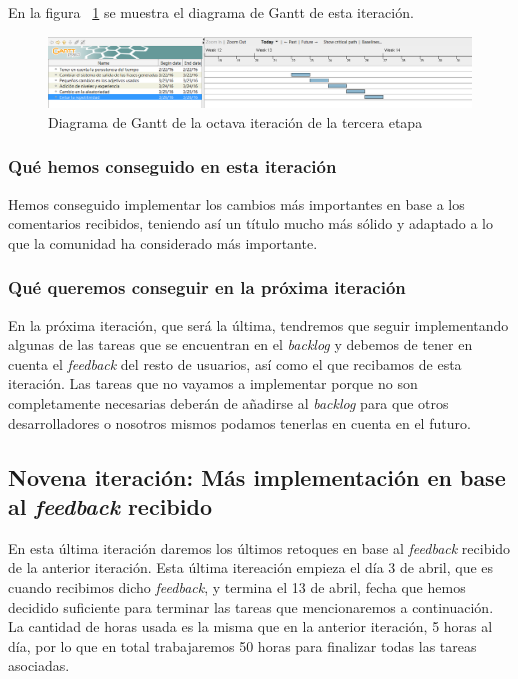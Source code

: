 En la figura ~\ref{fig:sec3it8} se muestra el diagrama de Gantt de esta iteración.

\begin{figure}
    \includegraphics[width=\textwidth,height=\textheight,keepaspectratio]{./img/sec3it8.png}
  \caption{Diagrama de Gantt de la octava iteración de la tercera etapa}
  \label{fig:sec3it8}
\end{figure}

\subsubsection{Qué hemos conseguido en esta iteración}

Hemos conseguido implementar los cambios más importantes en base a los comentarios recibidos, teniendo así un título mucho más sólido y adaptado a lo que la comunidad ha considerado más importante.

\subsubsection{Qué queremos conseguir en la próxima iteración}

En la próxima iteración, que será la última, tendremos que seguir implementando algunas de las tareas que se encuentran en el \textit{backlog} y debemos de tener en cuenta el \textit{feedback} del resto de usuarios, así como el que recibamos de esta iteración.
Las tareas que no vayamos a implementar porque no son completamente necesarias deberán de añadirse al \textit{backlog} para que otros desarrolladores o nosotros mismos podamos tenerlas en cuenta en el futuro.

\subsection{Novena iteración: Más implementación en base al \textit{feedback} recibido}

En esta última iteración daremos los últimos retoques en base al \textit{feedback} recibido de la anterior iteración. Esta última itereación empieza el día 3 de abril, que es cuando recibimos dicho \textit{feedback}, y termina el 13 de abril, fecha que hemos decidido suficiente para terminar las tareas que mencionaremos a continuación. La cantidad de horas usada es la misma que en la anterior iteración, 5 horas al día, por lo que en total trabajaremos 50 horas para finalizar todas las tareas asociadas.

